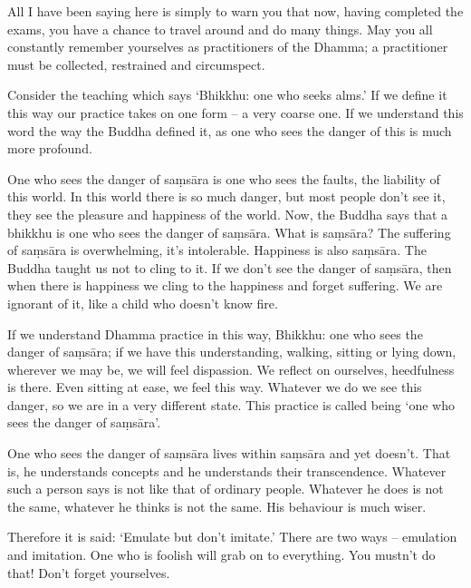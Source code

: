 All I have been saying here is simply to warn you that now, having completed the exams, you have a chance to travel around and do many things. May you all constantly remember yourselves as practitioners of the Dhamma; a practitioner must be collected, restrained and circumspect. 

Consider the teaching which says `Bhikkhu: one who seeks alms.' If we define it this way our practice takes on one form -- a very coarse one. If we understand this word the way the Buddha defined it, as one who sees the danger of  this is much more profound. 

One who sees the danger of sa\d{m}s\=ara is one who sees the faults, the liability of this world. In this world there is so much danger, but most people don't see it, they see the pleasure and happiness of the world. Now, the Buddha says that a bhikkhu is one who sees the danger of sa\d{m}s\=ara. What is sa\d{m}s\=ara? The suffering of sa\d{m}s\=ara is overwhelming, it's intolerable. Happiness is also sa\d{m}s\=ara. The Buddha taught us not to cling to it. If we don't see the danger of sa\d{m}s\=ara, then when there is happiness we cling to the happiness and forget suffering. We are ignorant of it, like a child who doesn't know fire. 

If we understand Dhamma practice in this way, Bhikkhu: one who sees the danger of sa\d{m}s\=ara; if we have this understanding, walking, sitting or lying down, wherever we may be, we will feel dispassion. We reflect on ourselves, heedfulness is there. Even sitting at ease, we feel this way. Whatever we do we see this danger, so we are in a very different state. This practice is called being `one who sees the danger of sa\d{m}s\=ara'. 

One who sees the danger of sa\d{m}s\=ara lives within sa\d{m}s\=ara and yet doesn't. That is, he understands concepts and he understands their transcendence. Whatever such a person says is not like that of ordinary people. Whatever he does is not the same, whatever he thinks is not the same. His behaviour is much wiser. 

Therefore it is said: `Emulate but don't imitate.' There are two ways -- emulation and imitation. One who is foolish will grab on to everything. You mustn't do that! Don't forget yourselves. 

